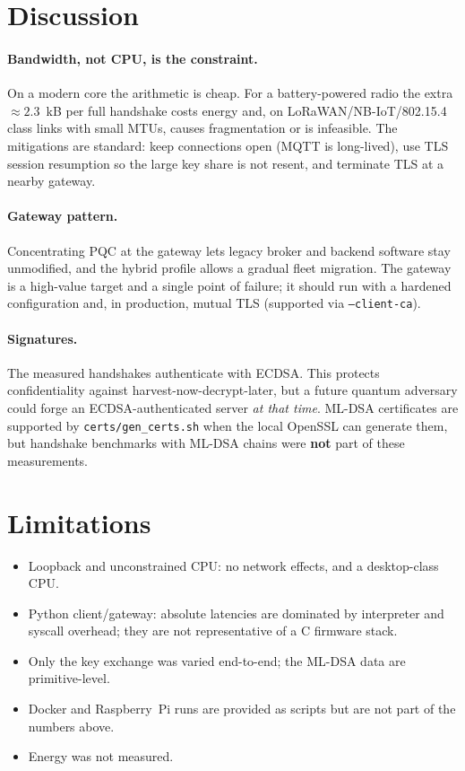 \documentclass[11pt,a4paper]{article}
\begin{document}
\section{Discussion}
\paragraph{Bandwidth, not CPU, is the constraint.} On a modern core the arithmetic is cheap.
For a battery-powered radio the extra ${\approx}2.3$~kB per full handshake costs energy
and, on LoRaWAN/NB-IoT/802.15.4 class links with small MTUs, causes fragmentation or is
infeasible. The mitigations are standard: keep connections open (MQTT is long-lived),
use TLS session resumption so the large key share is not resent, and terminate TLS at a
nearby gateway.

\paragraph{Gateway pattern.} Concentrating PQC at the gateway lets legacy broker and
backend software stay unmodified, and the hybrid profile allows a gradual fleet migration.
The gateway is a high-value target and a single point of failure; it should run with a
hardened configuration and, in production, mutual TLS (supported via \texttt{--client-ca}).

\paragraph{Signatures.} The measured handshakes authenticate with ECDSA. This protects
confidentiality against harvest-now-decrypt-later, but a future quantum adversary could forge
an ECDSA-authenticated server \emph{at that time}. ML-DSA certificates are supported by
\texttt{certs/gen\_certs.sh} when the local OpenSSL can generate them, but handshake
benchmarks with ML-DSA chains were \textbf{not} part of these measurements.

\section{Limitations}
\begin{itemize}
\item Loopback and unconstrained CPU: no network effects, and a desktop-class CPU.
\item Python client/gateway: absolute latencies are dominated by interpreter and syscall
      overhead; they are not representative of a C firmware stack.
\item Only the key exchange was varied end-to-end; the ML-DSA data are primitive-level.
\item Docker and Raspberry~Pi runs are provided as scripts but are not part of the numbers above.
\item Energy was not measured.
\end{itemize}
\end{document}

